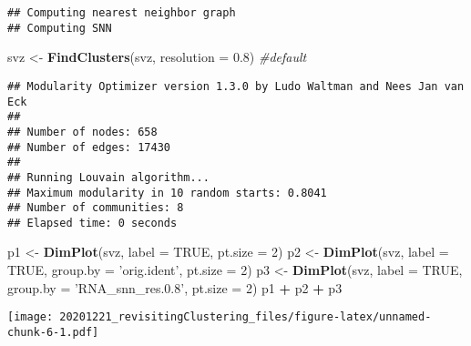 \documentclass[
]{article}
\newenvironment{Shaded}{\begin{snugshade}}{\end{snugshade}}
\newcommand{\CommentTok}[1]{\textcolor[rgb]{0.56,0.35,0.01}{\textit{#1}}}
\newcommand{\DataTypeTok}[1]{\textcolor[rgb]{0.13,0.29,0.53}{#1}}
\newcommand{\DecValTok}[1]{\textcolor[rgb]{0.00,0.00,0.81}{#1}}
\newcommand{\FloatTok}[1]{\textcolor[rgb]{0.00,0.00,0.81}{#1}}
\newcommand{\KeywordTok}[1]{\textcolor[rgb]{0.13,0.29,0.53}{\textbf{#1}}}
\newcommand{\NormalTok}[1]{#1}
\newcommand{\OperatorTok}[1]{\textcolor[rgb]{0.81,0.36,0.00}{\textbf{#1}}}
\newcommand{\OtherTok}[1]{\textcolor[rgb]{0.56,0.35,0.01}{#1}}
\newcommand{\StringTok}[1]{\textcolor[rgb]{0.31,0.60,0.02}{#1}}
\begin{document}
\begin{verbatim}
## Computing nearest neighbor graph
## Computing SNN
\end{verbatim}

\begin{Shaded}
\begin{Highlighting}[]
\NormalTok{svz <-}\StringTok{ }\KeywordTok{FindClusters}\NormalTok{(svz, }\DataTypeTok{resolution =} \FloatTok{0.8}\NormalTok{) }\CommentTok{#default}
\end{Highlighting}
\end{Shaded}

\begin{verbatim}
## Modularity Optimizer version 1.3.0 by Ludo Waltman and Nees Jan van Eck
## 
## Number of nodes: 658
## Number of edges: 17430
## 
## Running Louvain algorithm...
## Maximum modularity in 10 random starts: 0.8041
## Number of communities: 8
## Elapsed time: 0 seconds
\end{verbatim}

\begin{Shaded}
\begin{Highlighting}[]
\NormalTok{p1 <-}\StringTok{ }\KeywordTok{DimPlot}\NormalTok{(svz, }\DataTypeTok{label =} \OtherTok{TRUE}\NormalTok{, }\DataTypeTok{pt.size =} \DecValTok{2}\NormalTok{)}
\NormalTok{p2 <-}\StringTok{ }\KeywordTok{DimPlot}\NormalTok{(svz, }\DataTypeTok{label =} \OtherTok{TRUE}\NormalTok{, }\DataTypeTok{group.by =} \StringTok{'orig.ident'}\NormalTok{, }\DataTypeTok{pt.size =} \DecValTok{2}\NormalTok{)}
\NormalTok{p3 <-}\StringTok{ }\KeywordTok{DimPlot}\NormalTok{(svz, }\DataTypeTok{label =} \OtherTok{TRUE}\NormalTok{, }\DataTypeTok{group.by =} \StringTok{'RNA_snn_res.0.8'}\NormalTok{, }\DataTypeTok{pt.size =} \DecValTok{2}\NormalTok{)}
\NormalTok{p1 }\OperatorTok{+}\StringTok{ }\NormalTok{p2 }\OperatorTok{+}\StringTok{ }\NormalTok{p3}
\end{Highlighting}
\end{Shaded}

\texttt{[image: 20201221\_revisitingClustering\_files/figure-latex/unnamed-chunk-6-1.pdf]}
\end{document}
